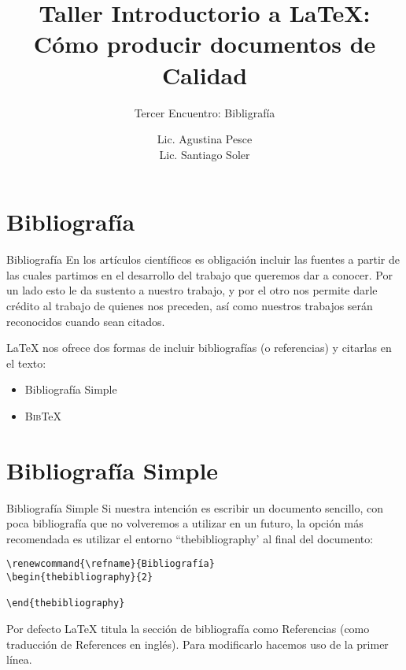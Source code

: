 \documentclass[11pt]{beamer}
\author{Lic. Agustina Pesce \\ Lic. Santiago Soler}
\title[Taller de {\LaTeX}]{Taller Introductorio a {\LaTeX}: \\ Cómo producir documentos de Calidad}
\subtitle{Tercer Encuentro: Bibligrafía}
\date{}
\newcommand{\BibTeX}{\textsc{Bib}\TeX{}}
\begin{document}
\maketitle


\section{Bibliografía}


\begin{frame}{Bibliografía}
En los artículos científicos es obligación incluir las fuentes a partir de las cuales partimos en el desarrollo del trabajo que queremos dar a conocer. Por un lado esto le da sustento a nuestro trabajo, y por el otro nos permite darle crédito al trabajo de quienes nos preceden, así como nuestros trabajos serán reconocidos cuando sean citados.

\LaTeX{} nos ofrece dos formas de incluir bibliografías (o referencias) y citarlas en el texto:
\begin{itemize}
\item{Bibliografía Simple}
\item{\BibTeX{}}
\end{itemize}
\end{frame}


\section{Bibliografía Simple}


\begin{frame}[fragile]{Bibliografía Simple}
Si nuestra intención es escribir un documento sencillo, con poca bibliografía que no volveremos a utilizar en un futuro, la opción más recomendada es utilizar el entorno ``thebibliography' al final del documento:

{\color{new_green} \scriptsize
\begin{verbatim}
\renewcommand{\refname}{Bibliografía}
\begin{thebibliography}{2}

\end{thebibliography}
\end{verbatim}
}

Por defecto \LaTeX{} titula la sección de bibliografía como Referencias (como traducción de References en inglés). Para modificarlo hacemos uso de la primer línea.
\end{frame}
\end{document}
